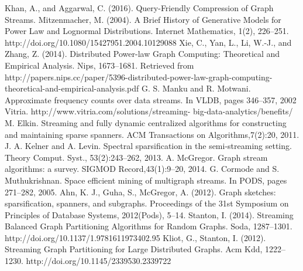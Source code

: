 \documentclass[12pt]{report}
\numberwithin{figure}{section}
\numberwithin{table}{section}
\begin{document}
\begin{thebibliography}{1}
   Khan, A., and Aggarwal, C. (2016). Query-Friendly Compression of Graph Streams.
  Mitzenmacher, M. (2004). A Brief History of Generative Models for Power Law and Lognormal Distributions. Internet Mathematics, 1(2), 226–251. http://doi.org/10.1080/15427951.2004.10129088
  Xie, C., Yan, L., Li, W.-J., and Zhang, Z. (2014). Distributed Power-law Graph Computing: Theoretical and Empirical Analysis. Nips, 1673--1681. Retrieved from http://papers.nips.cc/paper/5396-distributed-power-law-graph-computing-theoretical-and-empirical-analysis.pdf
  G. S. Manku and R. Motwani. Approximate frequency counts over data streams. In VLDB, pages 346–357, 2002
   Vitria. http://www.vitria.com/solutions/streaming- big-data-analytics/benefits/
  M. Elkin. Streaming and fully dynamic centralized algorithms for constructing and maintaining sparse spanners. ACM Transactions on Algorithms,7(2):20, 2011.
   J. A. Kelner and A. Levin. Spectral sparsification in the semi-streaming setting. Theory Comput. Syst., 53(2):243–262, 2013.
  A. McGregor. Graph stream algorithms: a survey. SIGMOD Record,43(1):9–20, 2014.
  G. Cormode and S. Muthukrishnan. Space efficient mining of multigraph streams. In PODS, pages 271–282, 2005.
  Ahn, K. J., Guha, S.,  McGregor, A. (2012). Graph sketches: sparsification, spanners, and subgraphs. Proceedings of the 31st Symposium on Principles of Database Systems, 2012(Pods), 5–14.
  Stanton, I. (2014). Streaming Balanced Graph Partitioning Algorithms for Random Graphs. Soda, 1287–1301. http://doi.org/10.1137/1.9781611973402.95
  Kliot, G.,  Stanton, I. (2012). Streaming Graph Partitioning for Large Distributed Graphs. Acm Kdd, 1222–1230. http://doi.org/10.1145/2339530.2339722
  
  
  
\end{thebibliography}
\end{document}
